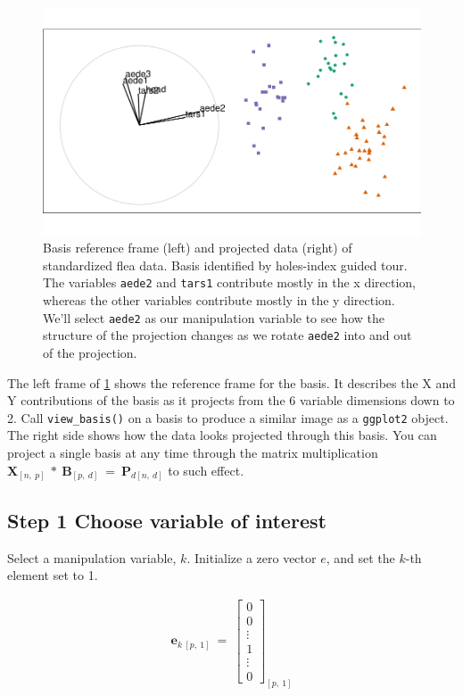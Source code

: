 \documentclass{monashthesis}
\begin{document}
\begin{figure}
\centering
\includegraphics{thesis_files/figure-latex/step0-1.pdf}
\caption{\label{fig:step0}Basis reference frame (left) and projected data
(right) of standardized flea data. Basis identified by holes-index
guided tour. The variables \texttt{aede2} and \texttt{tars1} contribute
mostly in the x direction, whereas the other variables contribute mostly
in the y direction. We'll select \texttt{aede2} as our manipulation
variable to see how the structure of the projection changes as we rotate
\texttt{aede2} into and out of the projection.}
\end{figure}

The left frame of \ref{fig:step0} shows the reference frame for the
basis. It describes the X and Y contributions of the basis as it
projects from the 6 variable dimensions down to 2. Call
\texttt{view\_basis()} on a basis to produce a similar image as a
\texttt{ggplot2} object. The right side shows how the data looks
projected through this basis. You can project a single basis at any time
through the matrix multiplication
\(\textbf{X}_{[n,~p]} ~*~ \textbf{B}_{[p,~d]} ~=~ \textbf{P}_{d[n,~d]}\)
to such effect.

\subsection{Step 1 Choose variable of
interest}\label{step-1-choose-variable-of-interest}

Select a manipulation variable, \(k\). Initialize a zero vector \(e\),
and set the \(k\)-th element set to 1.

\begin{align*}
\textbf{e}_{k~[p,~1]} ~=~ 
  \begin{bmatrix}
    0 \\
    0 \\
    \vdots \\
    1 \\
    \vdots \\
    0
  \end{bmatrix}_{[p,~1]}
\end{align*}
\end{document}
